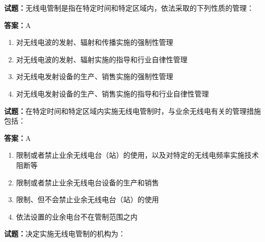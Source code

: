 \documentclass{ctexbook}
\begin{document}




\vspace{1em}

\textbf{试题：}无线电管制是指在特定时间和特定区域内，依法采取的下列性质的管理： 

\textbf{答案：}A 

\begin{enumerate}[leftmargin=3em]
  \item 对无线电波的发射、辐射和传播实施的强制性管理 

  \item 对无线电波的发射、辐射实施的指导和行业自律性管理 

  \item 对无线电发射设备的生产、销售实施的强制性管理 

  \item 对无线电发射设备的生产、销售实施的指导和行业自律性管理 

\end{enumerate}





\vspace{1em}

\textbf{试题：}在特定时间和特定区域内实施无线电管制时，与业余无线电有关的管理措施包括： 

\textbf{答案：}A 


\begin{enumerate}[leftmargin=3em]
  \item 限制或者禁止业余无线电台（站）的使用，以及对特定的无线电频率实施技术阻断等 

  \item 限制或者禁止业余无线电台设备的生产和销售 

  \item 限制、但不会禁止业余无线电台（站）的使用 

  \item 依法设置的业余电台不在管制范围之内 

\end{enumerate}





\vspace{1em}

\textbf{试题：}决定实施无线电管制的机构为： 
\end{document}
